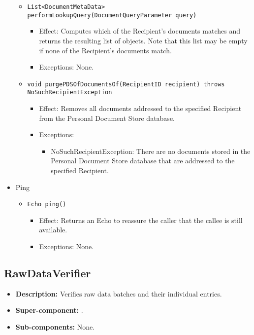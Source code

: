 \begin{itemize}
\begin{itemize}
		\item \texttt{List<DocumentMetaData> performLookupQuery(DocumentQueryParameter query)}
		\begin{itemize}
			\item Effect: Computes which of the Recipient's documents matches  and returns the resulting list of  objects. Note that this list may be empty if none of the Recipient's documents match.
			\item Exceptions: None.
		\end{itemize}

		\item \texttt{void purgePDSOfDocumentsOf(RecipientID recipient) throws NoSuchRecipientException}
		\begin{itemize}
			\item Effect: Removes all documents addressed to the specified Recipient from the Personal Document Store database.
			\item Exceptions:
			\begin{itemize}
				\item NoSuchRecipientException: There are no documents stored in the Personal Document Store database that are addressed to the specified Recipient.
			\end{itemize}
		\end{itemize}
	\end{itemize}

	\item Ping
	\begin{itemize}
		\item \texttt{Echo ping()}
		\begin{itemize}
			\item Effect: Returns an Echo to reassure the caller that the callee is still available.
			\item Exceptions: None.
		\end{itemize}
	\end{itemize}
\end{itemize}

\subsection{RawDataVerifier}\label{sec:rawdataverifier}
\begin{itemize}
	\item \textbf{Description:} Verifies raw data batches and their individual entries.
	\item \textbf{Super-component:} .
	\item \textbf{Sub-components:} None.
\end{itemize}

